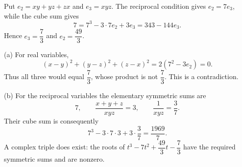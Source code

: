 Put $e_2=xy+yz+zx$ and $e_3=xyz$. The reciprocal condition gives $e_2=7e_3$, while the cube sum gives
\[
7=7^3-3\cdot7e_2+3e_3=343-144e_3.
\]
Hence $e_3=\dfrac{7}{3}$ and $e_2=\dfrac{49}{3}$.

(a) For real variables,
\[
(x-y)^2+(y-z)^2+(z-x)^2=2(7^2-3e_2)=0.
\]
Thus all three would equal $\dfrac{7}{3}$, whose product is not $\dfrac{7}{3}$. This is a contradiction.

(b) For the reciprocal variables the elementary symmetric sums are
\[
7,\qquad\dfrac{x+y+z}{xyz}=3,\qquad\dfrac{1}{xyz}=\dfrac{3}{7}.
\]
Their cube sum is consequently
\[
7^3-3\cdot7\cdot3+3\cdot\dfrac{3}{7}=\boxed{\dfrac{1969}{7}}.
\]
A complex triple does exist: the roots of $t^3-7t^2+\dfrac{49}{3}t-\dfrac{7}{3}$ have the required symmetric sums and are nonzero.
